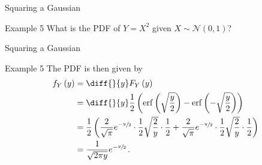 \documentclass[10pt]{beamer}
\begin{document}
\begin{frame}[fragile]{Squaring a Gaussian}
\begin{exampleblock}{Example 5}
What is the PDF of \(Y = X^2\) given \(X\sim\mathcal{N}\left(0, 1\right)\)?
\end{exampleblock}
\end{frame}

\begin{frame}[fragile]{Squaring a Gaussian}
\begin{exampleblock}{Example 5}
The PDF is then given by
\begin{equation*}
\begin{aligned}
    f_Y\left(y\right) &= \diff{}{y}F_Y\left(y\right)\\
    &= \diff{}{y}\frac{1}{2}\left(\mathrm{erf}\left(\sqrt{\frac{y}{2}}\right) - \mathrm{erf}\left(-\sqrt{\frac{y}{2}}\right)\right)\\
    &= \frac{1}{2}\left(\frac{2}{\sqrt{\pi}}e^{-\sfrac{y}{2}}\cdot\frac{1}{2}\sqrt{\frac{2}{y}}\cdot\frac{1}{2} + \frac{2}{\sqrt{\pi}}e^{-\sfrac{y}{2}}\cdot\frac{1}{2}\sqrt{\frac{2}{y}}\cdot\frac{1}{2}\right)\\
    &= \frac{1}{\sqrt{2\pi y}}e^{-\sfrac{y}{2}}\,.
\end{aligned}
\end{equation*}
\end{exampleblock}
\end{frame}
\end{document}
